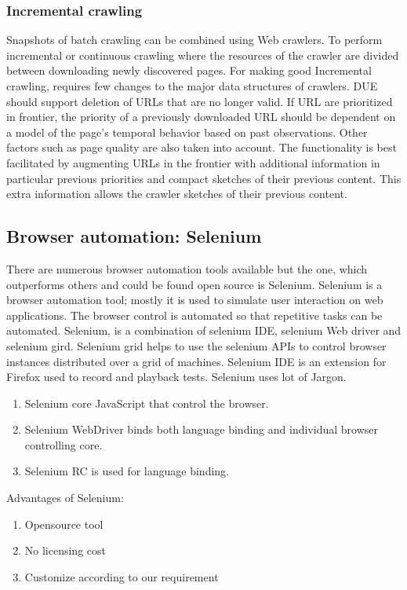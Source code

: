 \documentclass[article,type=msc,colorback,accentcolor=tud9c,twoside,11pt]{tudthesis}
\begin{document}
\subsubsection{Incremental crawling}
Snapshots of batch crawling can be combined using Web crawlers. To perform incremental or continuous crawling where the resources of the crawler are divided between downloading newly discovered pages. For making good Incremental crawling, requires few changes to the major data structures of crawlers. DUE should support deletion of URLs that are no longer valid. If URL are prioritized in frontier, the priority of a previously downloaded URL should be dependent on a model of the page's temporal behavior based on past observations. Other factors such as page quality are also taken into account. The functionality is best facilitated by augmenting URLs in the frontier with additional information in particular previous priorities and compact sketches of their previous content. This extra information allows the crawler sketches of their previous content.

\subsection{Browser automation: Selenium}
There are numerous browser automation tools available but the one, which outperforms others and could be found open source is Selenium. Selenium\cite{AutomationTestingAnIntroductiontoSelenium} is a browser automation tool; mostly it is used to simulate user interaction on web applications. The browser control is automated so that repetitive tasks can be automated. Selenium,  is a combination of selenium IDE, selenium Web driver and selenium gird. Selenium grid helps to use the selenium APIs to control browser instances distributed over a grid of machines. Selenium IDE is an extension for Firefox used to record and playback tests. Selenium uses lot of Jargon.

\begin{enumerate}
\item Selenium core JavaScript that control the browser.
\item Selenium WebDriver binds both language binding and individual browser controlling core.
\item Selenium RC is used for language binding.
\end{enumerate}

Advantages of Selenium:
\begin{enumerate}
\item Opensource tool
\item No licensing cost
\item Customize according to our requirement
\end{enumerate}
\end{document}
